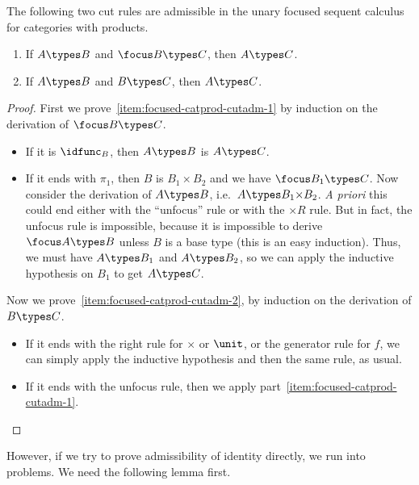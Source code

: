 \begin{lem}\label{thm:focused-catprod-cutadm}
  The following two cut rules are admissible in the unary focused sequent calculus for categories with products.
  \begin{enumerate}
    \item If $A\types B$ and $\focus B\types C$, then $A\types C$.\label{item:focused-catprod-cutadm-1}
    \item If $A\types B$ and $B\types C$, then $A\types C$.\label{item:focused-catprod-cutadm-2}
  \end{enumerate}
\end{lem}
\begin{proof}
  First we prove~\ref{item:focused-catprod-cutadm-1} by induction on the derivation of $\focus B\types C$.
  \begin{itemize}
  \item If it is $\idfunc_B$, then $A\types B$ is $A\types C$.
  \item If it ends with $\pi_1$, then $B$ is $B_1\times B_2$ and we have $\focus B_1\types C$.
    Now consider the derivation of $A\types B$, i.e.\ $A\types B_1\times B_2$.
    \textit{A priori} this could end either with the ``unfocus'' rule or with the $\times R$ rule.
    But in fact, the unfocus rule is impossible, because it is impossible to derive $\focus A\types B$ unless $B$ is a base type (this is an easy induction).
    Thus, we must have $A\types B_1$ and $A\types B_2$, so we can apply the inductive hypothesis on $B_1$ to get $A\types C$.
  \end{itemize}
  Now we prove~\ref{item:focused-catprod-cutadm-2}, by induction on the derivation of $B\types C$.
  \begin{itemize}
  \item If it ends with the right rule for $\times$ or $\unit$, or the generator rule for $f$, we can simply apply the inductive hypothesis and then the same rule, as usual.
  \item If it ends with the unfocus rule, then we apply part~\ref{item:focused-catprod-cutadm-1}.\qedhere
  \end{itemize}
\end{proof}

However, if we try to prove admissibility of identity directly, we run into problems.
We need the following lemma first.


